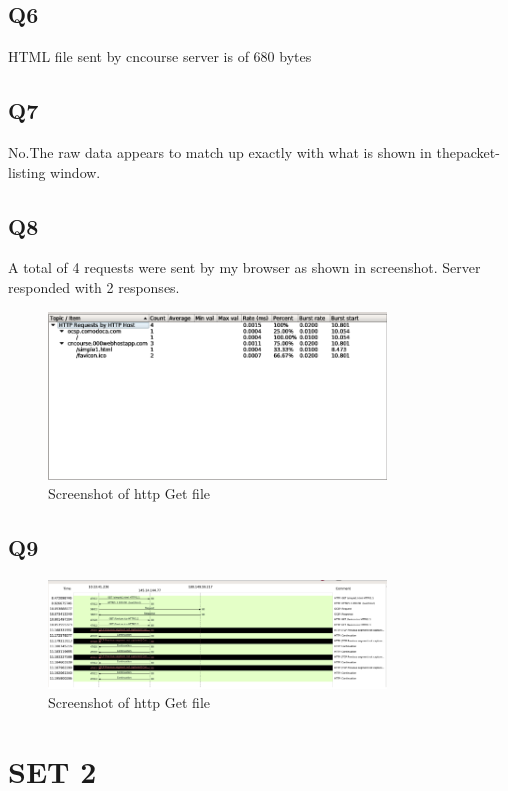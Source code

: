\documentclass{article}
\begin{document}
\subsection{Q6}
HTML file sent by cncourse server is of 680 bytes\\
\subsection{Q7}
No.The raw data appears to match up exactly with what is shown in thepacket-listing window.\\
\subsection{Q8}
A total of 4 requests were sent by my browser as shown in screenshot. Server responded with 2 responses.\\
  \begin{figure}[H]
 \centering
 \includegraphics[width=0.8\textwidth]{../Set1/q8/a.png}
 \caption{\label{fig:PING}Screenshot of http Get file}
 \end{figure}
\subsection{Q9}
  \begin{figure}[H]
 \centering
 \includegraphics[width=0.8\textwidth]{../Set1/q9/a.png}
 \caption{\label{fig:PING}Screenshot of http Get file}
 \end{figure}


\section{SET 2}
\end{document}
